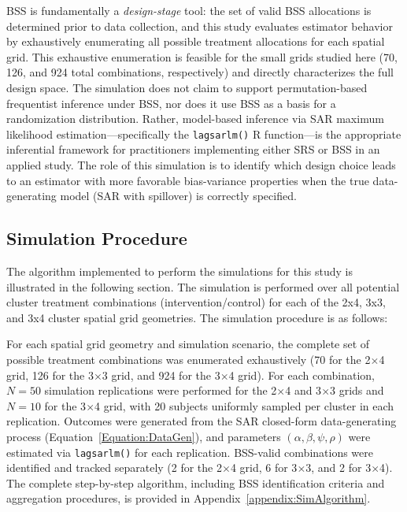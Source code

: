 \documentclass{article}[11pt]
\begin{document}
BSS is fundamentally a \emph{design-stage} tool: the set of valid BSS allocations is determined prior to data collection, and this study evaluates estimator behavior by exhaustively enumerating all possible treatment allocations for each spatial grid. This exhaustive enumeration is feasible for the small grids studied here (70, 126, and 924 total combinations, respectively) and directly characterizes the full design space. The simulation does not claim to support permutation-based frequentist inference under BSS, nor does it use BSS as a basis for a randomization distribution. Rather, model-based inference via SAR maximum likelihood estimation---specifically the \texttt{lagsarlm()} R function---is the appropriate inferential framework for practitioners implementing either SRS or BSS in an applied study. The role of this simulation is to identify which design choice leads to an estimator with more favorable bias-variance properties when the true data-generating model (SAR with spillover) is correctly specified.

\subsection{Simulation Procedure}

The algorithm implemented to perform the simulations for this study is illustrated in the following section. The simulation is performed over all potential cluster treatment combinations (intervention/control) for each of the 2x4, 3x3, and 3x4 cluster spatial grid geometries. The simulation procedure is as follows:

For each spatial grid geometry and simulation scenario, the complete set of possible treatment combinations was enumerated exhaustively (70 for the 2$\times$4 grid, 126 for the 3$\times$3 grid, and 924 for the 3$\times$4 grid). For each combination, $N = 50$ simulation replications were performed for the 2$\times$4 and 3$\times$3 grids and $N = 10$ for the 3$\times$4 grid, with 20 subjects uniformly sampled per cluster in each replication. Outcomes were generated from the SAR closed-form data-generating process (Equation~\ref{Equation:DataGen}), and parameters $(\alpha, \beta, \psi, \rho)$ were estimated via \texttt{lagsarlm()} for each replication. BSS-valid combinations were identified and tracked separately (2 for the 2$\times$4 grid, 6 for 3$\times$3, and 2 for 3$\times$4). The complete step-by-step algorithm, including BSS identification criteria and aggregation procedures, is provided in Appendix~\ref{appendix:SimAlgorithm}.
\end{document}
